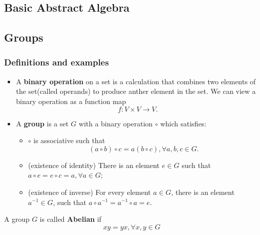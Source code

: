 \begin{refsection}


\startcontents[chapters]
\chapter{Basic Abstract Algebra}\label{ch:topics-in-abstract-algebra}


\section{Groups}
\subsection{Definitions and examples}
\begin{definition}\cite[26]{pinter2012book}
	\hfill
\begin{itemize}
	\item A \textbf{binary operation} on a set is a calculation that combines two elements of the set(called operands) to produce anther element in the set. We can view a binary operation as a function map $$f:V\times V \rightarrow V.$$
	\item  A \textbf{group} is a set $G$ with a binary operation $\circ$ which satisfies:
	\begin{itemize}
		\item $\circ$ is associative such that
		$$(a\circ b)\circ c = a(b\circ c), \forall a,b,c\in G.$$
		\item (existence of identity) There is an element $e\in G$ such that $a\circ e = e\circ c = a, \forall a\in G$;
		\item (existence of inverse) For every element $a \in G$, there is an element $a^{-1}\in G$, such that $a\circ a^{-1} = a^{-1}\circ a = e$.
	\end{itemize}
\end{itemize}	
\end{definition}


\begin{definition}
A group $G$ is called \textbf{Abelian} if
$$xy=yx,\forall x,y\in G$$
\end{definition}


\end{refsection}
